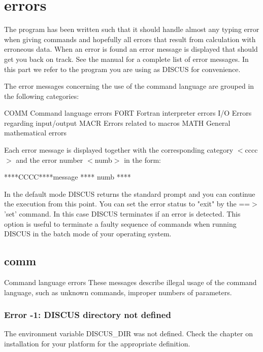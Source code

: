 \section{errors}
\par
The program has been written such that it should handle almost 
any typing error when giving commands and hopefully all errors 
that result from calculation with erroneous data. When an error 
is found an error message is displayed that should get you back 
on track. See the manual for a complete list of error messages. 
In this part we refer to the program you are using as DISCUS for 
convenience. 
\par
The error messages concerning the use of the command language 
are grouped in the following categories: 
\par
\begin{MacVerbatim}
COMM   Command language errors
FORT   Fortran interpreter errors
I/O    Errors regarding input/output
MACR   Errors related to macros
MATH   General mathematical errors
\end{MacVerbatim}
Each error message is displayed together with the corresponding 
category $ <$cccc$> $ and the error number $ <$numb$> $ in the form: 
\par
\begin{MacVerbatim}
****CCCC****message                    **** numb ****
\end{MacVerbatim}
In the default mode DISCUS returns the standard prompt and you can 
continue the execution from this point. You can set the error status 
to "exit" by the ==$> $'set' command. In this case DISCUS terminates 
if an error is detected. This option is useful to terminate a faulty 
sequence of commands when running DISCUS in the batch mode of your 
operating system. 
\par
\subsection*{comm}
\par
Command language errors 
These messages describe illegal usage of the command language, such as 
unknown commands, improper numbers of parameters. 
\par
\subsubsection{Error -1: DISCUS directory not defined}
\par
The environment variable DISCUS\_DIR was not defined. Check the chapter 
on installation for your platform for the appropriate definition. 
